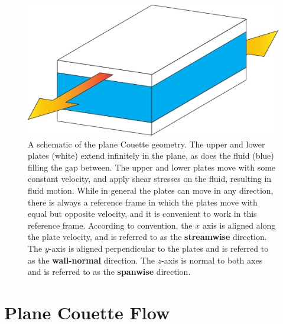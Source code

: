 \begin{figure}[h!]
\centerline{
\includegraphics[scale=0.4]{Figs/planeCouetteDiagram}}
\caption{A schematic of the plane Couette geometry. The upper and lower plates (white) extend infinitely in the plane, as does the fluid (blue) filling the gap between. The upper and lower plates move with some constant velocity, and apply shear stresses on the fluid, resulting in fluid motion. While in general the plates can move in any direction, there is always a reference frame in which the plates move with equal but opposite velocity, and it is convenient to work in this reference frame. According to convention, the $x$ axis is aligned along the plate velocity, and is referred to as the {\bf streamwise} direction. The $y$-axis is aligned perpendicular to the plates and is referred to as the {\bf wall-normal} direction. The $z$-axis is normal to both axes and is referred to as the {\bf spanwise} direction.}\label{fig:planeCouette}
\end{figure}

\section{Plane Couette Flow} 

